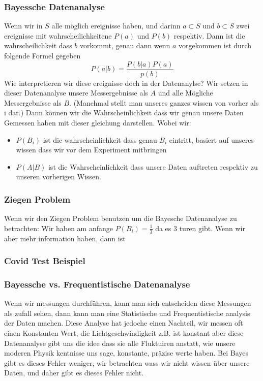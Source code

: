 \documentclass{article}
\begin{document}
\subsubsection*{Bayessche Datenanalyse}
Wenn wir in $S$ alle möglich ereignisse haben, und darinn $a\subset S$ und $b\subset S$ zwei ereignisse mit wahrscheilichkeitene $P(a)$ und $P(b)$ respektiv. Dann ist die wahrscheilichkeit dass $b$ vorkommt, genau dann wenn $a$ vorgekommen ist durch folgende Formel gegeben
\[P(a|b)=\frac{P(b|a)P(a)}{p(b)}\]
Wie interpretieren wir diese ereignisse doch in der Datenanylse? Wir setzen in dieser Datenanalyse unsere Messergebnisse als $A$ und alle Mögliche Messergebnisse als $B$. (Manchmal stellt man unseres ganzes wissen von vorher als i dar.) Dann können wir die Wahrscheinlichkeit dass wir genau unsere Daten Gemessen haben mit dieser gleichung darstellen.
Wobei wir:\begin{itemize}
  \item{$P(B_i)$ ist die wahrscheinlichkeit dass genau $B_i$ eintritt, basiert auf unseres wissen dass wir vor dem Experiment mitbringen}
  \item{$P(A|B)$ ist die Wahrscheinlichkeit dass unsere Daten auftreten respektiv zu unseren vorherigen Wissen.}
\end{itemize}
\subsubsection*{Ziegen Problem}
Wenn wir den Ziegen Problem benutzen um die Bayesche Datenanalyse zu betrachten:
Wir haben am anfange $P(B_i)=\frac{1}{3}$ da es $3$ turen gibt. Wenn wir aber mehr information haben, dann ist 

\subsubsection*{Covid Test Beispiel}

\subsubsection*{Bayessche vs. Frequentistische Datenanalyse} Wenn wir messungen durchführen, kann man sich entscheiden diese Messungen als zufall sehen, dann kann man eine Statistische und Frequentistische analysis der Daten machen.
Diese Analyse hat jedoche einen Nachteil, wir messen oft einen Konstanten Wert, die Lichtgeschwindigkeit z.B. ist konstant aber diese Datenanalyse gibt uns die idee dass sie alle Fluktuiren anstatt, wie unsere moderen Physik kentnisse uns sage, konstante, präzise werte haben.
Bei Bayes gibt es dieses Fehler weniger, wir betrachten wass wir nicht wissen über unsere Daten, und daher gibt es dieses Fehler nicht.
\end{document}
